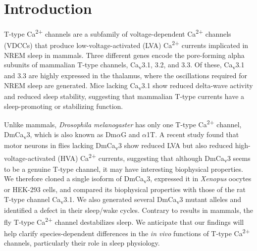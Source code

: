 \section*{Introduction}

T-type Ca\textsuperscript{2+} channels are a subfamily of voltage-dependent Ca\textsuperscript{2+} channels (VDCCs) that produce low-voltage-activated (LVA) Ca\textsuperscript{2+} currents implicated in NREM sleep in mammals\cite{Lee:2004ey}.
Three different genes encode the pore-forming alpha subunits of mammalian T-type channels, Ca\textsubscript{v}3.1, 3.2, and 3.3. Of these, Ca\textsubscript{v}3.1 and 3.3 are highly expressed in the thalamus, where the oscillations required for NREM sleep are generated\cite{steriade:1991aa, dossi:1992aa, talley:1999aa}.
Mice lacking Ca\textsubscript{v}3.1 show reduced delta-wave activity and reduced sleep stability, suggesting that mammalian T-type currents have a sleep-promoting or stabilizing function\cite{Lee:2004ey}.

Unlike mammals, \emph{Drosophila melanogaster} has only one T-type Ca\textsuperscript{2+} channel, DmCa\textsubscript{v}3, which is also known as Dm$\alpha$G and $\alpha$1T.
A recent study found that motor neurons in flies lacking DmCa\textsubscript{v}3 show reduced LVA but also reduced high-voltage-activated (HVA) Ca\textsuperscript{2+} currents, suggesting that although DmCa\textsubscript{v}3 seems to be a genuine T-type channel, it may have interesting biophysical properties\cite{Ryglewski:2012jk}.
We therefore cloned a single isoform of DmCa\textsubscript{v}3,  expressed it in \emph{Xenopus} oocytes or HEK-293 cells, and compared its biophysical properties with those of the rat T-type channel Ca\textsubscript{v}3.1.
We also generated several DmCa\textsubscript{v}3 mutant alleles and identified a defect in their sleep/wake cycles. Contrary to results in mammals, the fly T-type Ca\textsuperscript{2+} channel destabilizes sleep.
We anticipate that our findings will help clarify species-dependent differences in the \emph{in vivo} functions of T-type Ca\textsuperscript{2+} channels, particularly their role in sleep physiology.

